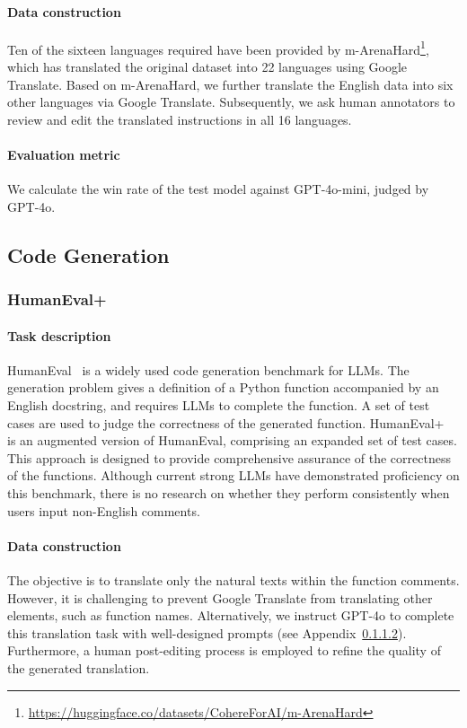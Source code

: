 \paragraph{Data construction}
Ten of the sixteen languages required have been provided by m-ArenaHard\footnote{\url{https://huggingface.co/datasets/CohereForAI/m-ArenaHard}}, which has translated the original dataset into 22 languages using Google Translate.
Based on m-ArenaHard, we further translate the English data into six other languages via Google Translate.
Subsequently, we ask human annotators to review and edit the translated instructions in all 16 languages.

\paragraph{Evaluation metric}
We calculate the win rate of the test model against GPT-4o-mini, judged by GPT-4o.

\subsection{Code Generation}
\subsubsection{HumanEval+}
\paragraph{Task description}
HumanEval~\cite{chen2021evaluating} is a widely used code generation benchmark for LLMs.
The generation problem gives a definition of a Python function accompanied by an English docstring, and requires LLMs to complete the function.
A set of test cases are used to judge the correctness of the generated function.
HumanEval+~\cite{liu2024your} is an augmented version of HumanEval, comprising an expanded set of test cases.
This approach is designed to provide comprehensive assurance of the correctness of the functions.
Although current strong LLMs have demonstrated proficiency on this benchmark, there is no research on whether they perform consistently when users input non-English comments.

\paragraph{Data construction}
The objective is to translate only the natural texts within the function comments.
However, it is challenging to prevent Google Translate from translating other elements, such as function names.
Alternatively, we instruct GPT-4o to complete this translation task with well-designed prompts (see Appendix~\ref{}).
Furthermore, a human post-editing process is employed to refine the quality of the generated translation.

